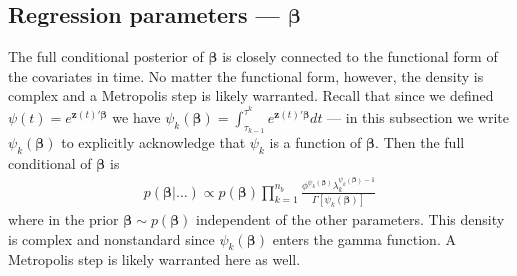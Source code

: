 \documentclass{article}
\begin{document}
\subsection{Regression parameters --- $\bm{\beta}$}
The full conditional posterior of $\bm{\beta}$ is closely connected to the functional form of the covariates in time. No matter the functional form, however, the density is complex and a Metropolis step is likely warranted. Recall that since we defined $\psi(t) = e^{\bm{z}(t)'\bm{\beta}}$ we have $\psi_k(\bm{\beta}) = \int_{\tau_{k-1}}^{\tau^k}e^{\bm{z}(t)'\bm{\beta}}dt$ --- in this subsection we write $\psi_k(\bm{\beta})$ to explicitly acknowledge that $\psi_k$ is a function of $\bm{\beta}$. Then the full conditional of $\bm{\beta}$ is
\begin{align*}
p(\bm{\beta}|\dots) \propto p(\bm{\beta})\prod_{k=1}^{n_b}\frac{\phi^{\psi_k(\bm{\beta})}\lambda_k^{\psi_k(\bm{\beta}) - 1}}{\Gamma[\psi_k(\bm{\beta})]}
\end{align*}
where in the prior $\bm{\beta} \sim p(\bm{\beta})$ independent of the other parameters. This density is complex and nonstandard since $\psi_k(\bm{\beta})$ enters the gamma function. A Metropolis step is likely warranted here as well.
\end{document}
